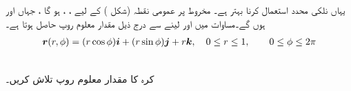 یہاں  نلکی  محدد  استعمال کرنا بہتر ہے۔ مخروط پر عمومی نقطہ   (شکل  ) کے لیے ، ،  ہو گا ، جہاں   اور  ہوں گے۔مساوات   میں  اور  لینے سے   درج ذیل مقدار معلوم  روپ  حاصل ہوتا ہے۔
\begin{align*}
{\ensuremath{{\boldsymbol{r}}}}(r,\phi)=(r\cos\phi){\boldsymbol{i}}+(r\sin\phi){\boldsymbol{j}}+r{\boldsymbol{k}},\quad 0\le r\le 1, \qquad 0\le \phi\le 2\pi
\end{align*}

\\
کرہ   کا مقدار معلوم  روپ تلاش کریں۔

